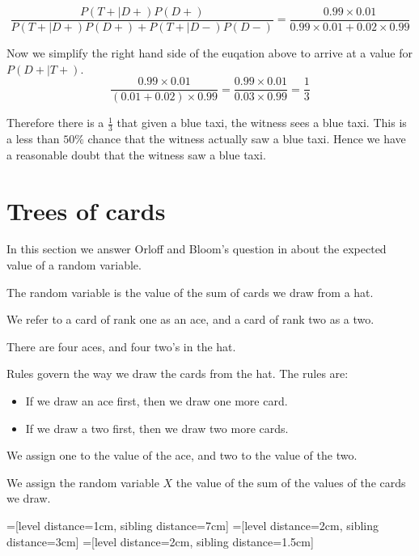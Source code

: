 \documentclass[a4paper,11pt]{article}
\begin{document}
\begin{equation}
\frac{ P \left( T+ \mid D+ \right) P \left( D+ \right) }
    { P \left( T+ \mid D+ \right) P \left( D+ \right) 
      + P \left( T+ \mid D- \right) P \left(D- \right)}
  = \frac{ 0.99 \times 0.01 }
  { 0.99 \times 0.01 + 0.02 \times 0.99 }
\end{equation}

Now we simplify the right hand side of the euqation above to arrive at
a value for $P \left( D+ \mid T+ \right)$.
\begin{equation}
 \frac{ 0.99 \times 0.01 }
  {  \left(0.01 + 0.02 \right) \times 0.99 }
  = \frac{ 0.99 \times 0.01 }
  {  0.03 \times 0.99 }
  = \frac{1}{3}
\end{equation}

Therefore there is a $\frac{1}{3}$ that given a blue taxi, the witness
sees a blue taxi.  This is a less than $50\%$ chance that the witness
actually saw a blue taxi. Hence we have a reasonable doubt that the 
witness saw a blue taxi.

\section{Trees of cards}

In this section we answer Orloff and Bloom's question in \cite{probSet2}
about the expected value of a random variable.

The random variable is the value of the sum of cards we draw from a 
hat.  

We refer to a card of rank one as an ace, and a card of rank two as
a two.

There are four aces, and four two's in the hat.

Rules govern the way we draw the cards from the hat.  The rules are: 
\begin{itemize}
\item If we draw an ace first, then we draw one more card. 
\item If we draw a two first, then we draw two more cards.
\end{itemize}

We assign one to the value of the ace, and two to the value of the two.

We assign the random variable $X$ the value of the sum of the values
of the cards we draw.

=[level distance=1cm, sibling distance=7cm]
=[level distance=2cm, sibling distance=3cm]
=[level distance=2cm, sibling distance=1.5cm]
\end{document}
